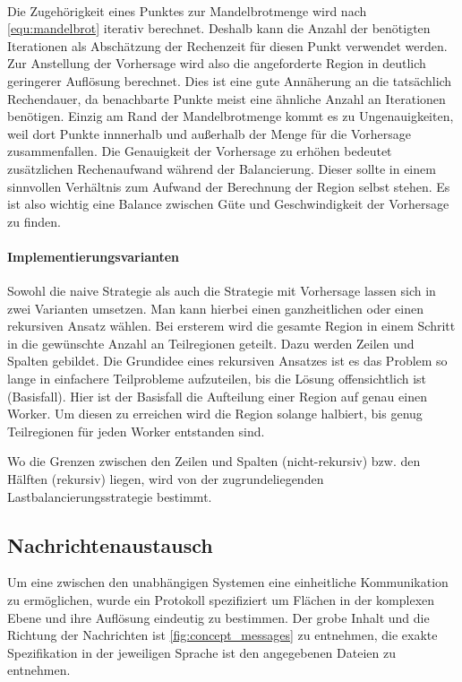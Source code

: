 \paragraph*{}\label{par:load_balancing_prediction}
Die Zugehörigkeit eines Punktes zur Mandelbrotmenge wird nach \autoref{equ:mandelbrot} iterativ berechnet.
Deshalb kann die Anzahl der benötigten Iterationen als Abschätzung der Rechenzeit für diesen Punkt verwendet werden.
Zur Anstellung der Vorhersage wird also die angeforderte Region in deutlich geringerer Auflösung berechnet.
Dies ist eine gute Annäherung an die tatsächlich Rechendauer, da benachbarte Punkte meist eine ähnliche Anzahl an Iterationen benötigen.
Einzig am Rand der Mandelbrotmenge kommt es zu Ungenauigkeiten, weil dort Punkte innnerhalb und außerhalb der Menge für die Vorhersage zusammenfallen.
Die Genauigkeit der Vorhersage zu erhöhen bedeutet zusätzlichen Rechenaufwand während der Balancierung.
Dieser sollte in einem sinnvollen Verhältnis zum Aufwand der Berechnung der Region selbst stehen.
Es ist also wichtig eine Balance zwischen Güte und Geschwindigkeit der Vorhersage zu finden.

\paragraph{Implementierungsvarianten}
Sowohl die naive Strategie als auch die Strategie mit Vorhersage lassen sich in zwei Varianten umsetzen.
Man kann hierbei einen ganzheitlichen oder einen rekursiven Ansatz wählen.
Bei ersterem wird die gesamte Region in einem Schritt in die gewünschte Anzahl an Teilregionen geteilt.
Dazu werden Zeilen und Spalten gebildet.
Die Grundidee eines rekursiven Ansatzes ist es das Problem so lange in einfachere Teilprobleme aufzuteilen, bis die Lösung offensichtlich ist (Basisfall).
Hier ist der Basisfall die Aufteilung einer Region auf genau einen Worker.
Um diesen zu erreichen wird die Region solange halbiert, bis genug Teilregionen für jeden Worker entstanden sind.

Wo die Grenzen zwischen den Zeilen und Spalten (nicht-rekursiv) bzw. den Hälften (rekursiv) liegen, wird von der zugrundeliegenden Lastbalancierungsstrategie bestimmt.

\subsection{Nachrichtenaustausch}
Um eine zwischen den unabhängigen Systemen eine einheitliche Kommunikation zu ermöglichen,
wurde ein Protokoll spezifiziert um Flächen in der komplexen Ebene und ihre Auflösung eindeutig zu bestimmen.
Der grobe Inhalt und die Richtung der Nachrichten ist \autoref{fig:concept_messages} zu entnehmen,
die exakte Spezifikation in der jeweiligen Sprache ist den angegebenen Dateien zu entnehmen.

